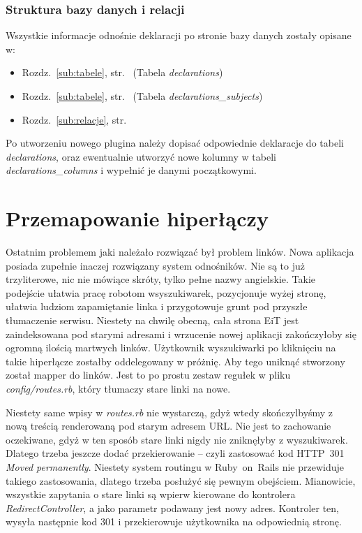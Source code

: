 \documentclass[a4paper,12pt,oneside]{report}
\begin{document}
\subsubsection{Struktura bazy danych i relacji}
Wszystkie informacje odnośnie deklaracji po stronie bazy danych zostały opisane w:
\begin{itemize}
  \item Rozdz.~\ref{sub:tabele}, str.~\pageref{subsub:declarations} (Tabela \emph{declarations})
  \item Rozdz.~\ref{sub:tabele}, str.~\pageref{subsub:declarations_subjects} (Tabela \emph{declarations\_subjects})
  \item Rozdz.~\ref{sub:relacje}, str.~\pageref{subsub:declarations-declarations_subjects}
\end{itemize}

Po utworzeniu nowego plugina należy dopisać odpowiednie deklaracje do tabeli \emph{declarations}, oraz ewentualnie utworzyć nowe kolumny w tabeli \emph{declarations\_columns} i wypełnić je danymi początkowymi.

\section{Przemapowanie hiperłączy}
\label{sec:mapa-linkow}
Ostatnim problemem jaki należało rozwiązać był problem linków. Nowa aplikacja posiada zupełnie inaczej rozwiązany system odnośników. Nie są to już trzyliterowe, nic nie mówiące skróty, tylko pełne nazwy angielskie. Takie podejście ułatwia pracę robotom wsyszukiwarek, pozycjonuje wyżej stronę, ułatwia ludziom zapamiętanie linka i przygotowuje grunt pod przyszłe tłumaczenie serwisu. Niestety na chwilę obecną, cała strona EiT jest zaindeksowana pod starymi adresami i wrzucenie nowej aplikacji zakończyłoby się ogromną ilością martwych linków. Użytkownik wyszukiwarki po kliknięciu na takie hiperłącze zostałby oddelegowany w próżnię. Aby tego uniknąć stworzony został mapper do linków. Jest to po prostu zestaw regułek w pliku \emph{config/routes.rb}, który tłumaczy stare linki na nowe.

Niestety same wpisy w \emph{routes.rb} nie wystarczą, gdyż wtedy skończylbyśmy z nową treścią renderowaną pod starym adresem URL. Nie jest to zachowanie oczekiwane, gdyż w ten sposób stare linki nigdy nie zniknęłyby z wyszukiwarek. Dlatego trzeba jeszcze dodać przekierowanie -- czyli zastosować kod HTTP~301 \emph{Moved permanently}. Niestety system routingu w Ruby~on~Rails nie przewiduje takiego zastosowania, dlatego trzeba posłużyć się pewnym obejściem. Mianowicie, wszystkie zapytania o stare linki są wpierw kierowane do kontrolera \emph{RedirectController}, a jako parametr podawany jest nowy adres. Kontroler ten, wysyła następnie kod 301 i przekierowuje użytkownika na odpowiednią stronę.
\end{document}
